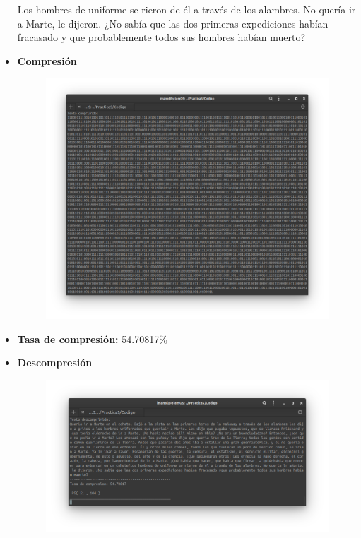\begin{itemize}
Los hombres de uniforme se rieron de él a través de los alambres. No quería ir a
Marte, le dijeron. ¿No sabía que las dos primeras expediciones habían fracasado y
que probablemente todos sus hombres habían muerto?
            \item \textbf{Compresión} \\
                \begin{figure}[h!]
                    \centering
                    \includegraphics[width=17cm]{Huffman/ejemplos/ejemplo4/ej4-comp.png}
                \end{figure}
                \newpage
            \item \textbf{Tasa de compresión:} 54.70817\% \\
            \item \textbf{Descompresión} \\
                \begin{figure}[h!]
                    \centering
                    \includegraphics[width=17cm]{Huffman/ejemplos/ejemplo4/ej4-decode.png}

\end{figure}
\end{itemize}
